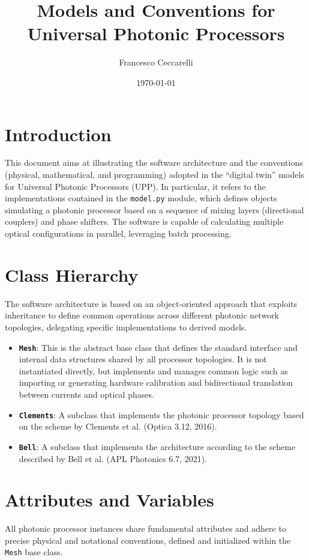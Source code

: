 \documentclass[11pt, a4paper]{article}
\title{\textbf{Models and Conventions for Universal Photonic Processors}}
\author{ Francesco Ceccarelli }
\date{\today}
\begin{document}
\maketitle

\section{Introduction}
This document aims at illustrating the software architecture and the conventions (physical, mathematical, and programming) adopted in the ``digital twin'' models for Universal Photonic Processors (UPP). In particular, it refers to the implementations contained in the \texttt{model.py} module, which defines objects simulating a photonic processor based on a sequence of mixing layers (directional couplers) and phase shifters. The software is capable of calculating multiple optical configurations in parallel, leveraging batch processing.

\section{Class Hierarchy}
The software architecture is based on an object-oriented approach that exploits inheritance to define common operations across different photonic network topologies, delegating specific implementations to derived models.

\begin{itemize}
    \item \textbf{\texttt{Mesh}}: This is the abstract base class that defines the standard interface and internal data structures shared by all processor topologies. It is not instantiated directly, but implements and manages common logic such as importing or generating hardware calibration and bidirectional translation between currents and optical phases.
    \item \textbf{\texttt{Clements}}: A subclass that implements the photonic processor topology based on the scheme by Clements et al. (Optica 3.12, 2016).
    \item \textbf{\texttt{Bell}}: A subclass that implements the architecture according to the scheme described by Bell et al. (APL Photonics 6.7, 2021).
\end{itemize}

\section{Attributes and Variables}
All photonic processor instances share fundamental attributes and adhere to precise physical and notational conventions, defined and initialized within the \texttt{Mesh} base class.
\end{document}
